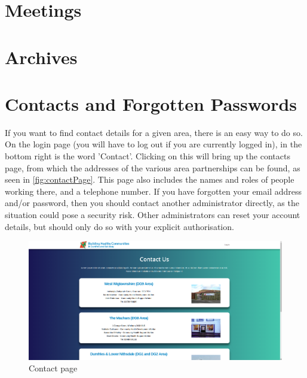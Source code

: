 \documentclass{bhcguides}
\begin{document}
\section{Meetings}
\label{sec:meetings}

\section{Archives}
\label{sec:archives}

\section{Contacts and Forgotten Passwords}
\label{sec:contacts}

If you want to find contact details for a given area, there is an easy way to do so. On the login page (you will have to log out if you are currently logged in), in the bottom right is the word 'Contact'. Clicking on this will bring up the contacts page, from which the addresses of the various area partnerships can be found, as seen in \autoref{fig:contactPage}. This page also includes the names and roles of people working there, and a telephone number. If you have forgotten your email address and/or password, then you should contact another administrator directly, as the situation could pose a security risk. Other administrators can reset your account details, but should only do so with your explicit authorisation.

\begin{figure}[h]
 \centerline{\includegraphics[width=\textwidth, height=\textheight, keepaspectratio]{contactpage.png}}
 \caption{Contact page}
 \label{fig:contactPage}
\end{figure}
\end{document}
